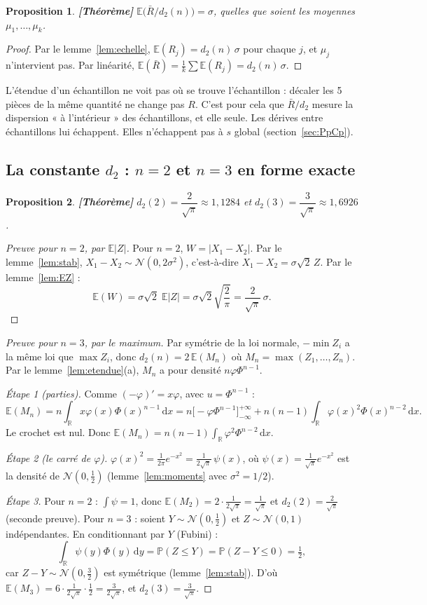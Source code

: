 \documentclass[11pt,a4paper]{article}
\theoremstyle{tq}
\newtheorem{prop}{Proposition}
\theoremstyle{remark}
\newcommand{\thm}{\textcolor{vertTQ}{\textbf{[Théorème]}}}
\newcommand{\E}{\mathbb{E}}
\renewcommand{\P}{\mathbb{P}}
\newcommand{\R}{\mathbb{R}}
\newcommand{\N}{\mathcal{N}}
\newcommand{\Rb}{\bar{R}}
\newcommand{\dd}{\,\mathrm{d}}
\begin{document}
\begin{prop}\thm{}
$\E\big(\Rb/d_2(n)\big)=\sigma$, quelles que soient les moyennes $\mu_1,\dots,\mu_k$.
\end{prop}
\begin{proof}
Par le lemme~\ref{lem:echelle}, $\E(R_j)=d_2(n)\,\sigma$ pour chaque $j$, et $\mu_j$ n'intervient pas. Par linéarité, $\E(\Rb)=\frac1k\sum\E(R_j)=d_2(n)\,\sigma$.
\end{proof}
\begin{cle}
L'étendue d'un échantillon ne voit pas où se trouve l'échantillon : décaler les 5 pièces de la même quantité ne change pas $R$. C'est pour cela que $\Rb/d_2$ mesure la dispersion « à l'intérieur » des échantillons, et elle seule. Les dérives entre échantillons lui échappent. Elles n'échappent pas à $s$ global (section~\ref{sec:PpCp}).
\end{cle}

\subsection{La constante $d_2$ : $n=2$ et $n=3$ en forme exacte}
\begin{prop}\thm{}
$d_2(2)=\dfrac{2}{\sqrt\pi}\approx1{,}1284$ \quad et \quad $d_2(3)=\dfrac{3}{\sqrt\pi}\approx1{,}6926$.
\end{prop}
\begin{proof}[Preuve pour $n=2$, par $\E|Z|$]
Pour $n=2$, $W=|X_1-X_2|$. Par le lemme~\ref{lem:stab}, $X_1-X_2\sim\N(0,2\sigma^2)$, c'est-à-dire $X_1-X_2=\sigma\sqrt2\,Z$. Par le lemme~\ref{lem:EZ} :
\[
\E(W)=\sigma\sqrt2\;\E|Z|=\sigma\sqrt2\sqrt{\frac2\pi}=\frac{2}{\sqrt\pi}\,\sigma .
\]
\end{proof}
\begin{proof}[Preuve pour $n=3$, par le maximum]
Par symétrie de la loi normale, $-\min Z_i$ a la même loi que $\max Z_i$, donc $d_2(n)=2\,\E(M_n)$ où $M_n=\max(Z_1,\dots,Z_n)$. Par le lemme~\ref{lem:etendue}(a), $M_n$ a pour densité $n\varphi\Phi^{n-1}$.

\emph{Étape 1 (parties).} Comme $(-\varphi)'=x\varphi$, avec $u=\Phi^{n-1}$ :
\[
\E(M_n)=n\int_{\R}x\varphi(x)\Phi(x)^{n-1}\dd x=n\Big[-\varphi\Phi^{n-1}\Big]_{-\infty}^{+\infty}+n(n-1)\int_{\R}\varphi(x)^2\Phi(x)^{n-2}\dd x .
\]
Le crochet est nul. Donc $\E(M_n)=n(n-1)\displaystyle\int_{\R}\varphi^2\Phi^{n-2}\dd x$.

\emph{Étape 2 (le carré de $\varphi$).} $\varphi(x)^2=\frac{1}{2\pi}e^{-x^2}=\frac{1}{2\sqrt\pi}\,\psi(x)$, où $\psi(x)=\frac{1}{\sqrt\pi}e^{-x^2}$ est la densité de $\N(0,\tfrac12)$ (lemme~\ref{lem:moments} avec $\sigma^2=1/2$).

\emph{Étape 3.} Pour $n=2$ : $\int\psi=1$, donc $\E(M_2)=2\cdot\frac{1}{2\sqrt\pi}=\frac1{\sqrt\pi}$ et $d_2(2)=\frac2{\sqrt\pi}$ (seconde preuve). Pour $n=3$ : soient $Y\sim\N(0,\frac12)$ et $Z\sim\N(0,1)$ indépendantes. En conditionnant par $Y$ (Fubini) :
\[
\int_{\R}\psi(y)\Phi(y)\dd y=\P(Z\le Y)=\P(Z-Y\le0)=\tfrac12,
\]
car $Z-Y\sim\N(0,\tfrac32)$ est symétrique (lemme~\ref{lem:stab}). D'où $\E(M_3)=6\cdot\frac{1}{2\sqrt\pi}\cdot\frac12=\frac{3}{2\sqrt\pi}$, et $d_2(3)=\frac{3}{\sqrt\pi}$.
\end{proof}
\end{document}
